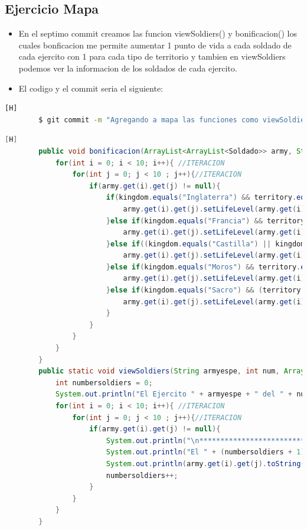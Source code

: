 \documentclass{article}
\begin{document}
	\subsection{Ejercicio Mapa}
	\begin{itemize}	
		\item En el septimo commit creamos las funcion viewSoldiers() y bonificacion() los cuales bonficacion me permite aumentar 1 punto de vida a cada soldado de cada ejercito con 1 para cada tipo de territorio y tambien en viewSoldiers podemos ver la informacion de los soldados de cada ejercito.	
		\item El codigo y el commit seria el siguiente:
	\end{itemize}	
	\begin{lstlisting}[language=bash,caption={Commit}][H]
		$ git commit -m "Agregando a mapa las funciones como viewSoldiers() y bonificacion() los cuales nos van poder mostrar el territorio y la informacion de cada soldado la cual fue cambiada por el tipo de territorio y reino que es este ejercito"
	\end{lstlisting}	
	\begin{lstlisting}[language=java,caption={Las lineas de codigos de la clase Mapa creada:}][H]
		public void bonificacion(ArrayList<ArrayList<Soldado>> army, String territory , String kingdom) {
			for(int i = 0; i < 10; i++){ //ITERACION
				for(int j = 0; j < 10 ; j++){//ITERACION
					if(army.get(i).get(j) != null){
						if(kingdom.equals("Inglaterra") && territory.equals("bosque")){
							army.get(i).get(j).setLifeLevel(army.get(i).get(j).getLifeLevel() + 1);
						}else if(kingdom.equals("Francia") && territory.equals("campo abierto")){
							army.get(i).get(j).setLifeLevel(army.get(i).get(j).getLifeLevel() + 1);
						}else if((kingdom.equals("Castilla") || kingdom.equals("Aragon")) && territory.equals("montana")){
							army.get(i).get(j).setLifeLevel(army.get(i).get(j).getLifeLevel() + 1);
						}else if(kingdom.equals("Moros") && territory.equals("desierto")){
							army.get(i).get(j).setLifeLevel(army.get(i).get(j).getLifeLevel() + 1);
						}else if(kingdom.equals("Sacro") && (territory.equals("desierto") || territory.equals("playa") || territory.equals("campo abierto"))){
							army.get(i).get(j).setLifeLevel(army.get(i).get(j).getLifeLevel() + 1);
						}
					}
				}
			}
		} 
		public static void viewSoldiers(String armyespe, int num, ArrayList<ArrayList<Soldado>> army){
			int numbersoldiers = 0;
			System.out.println("El Ejercito " + armyespe + " del " + num + " ejercito sus soldados son :");
			for(int i = 0; i < 10; i++){ //ITERACION
				for(int j = 0; j < 10 ; j++){//ITERACION
					if(army.get(i).get(j) != null){
						System.out.println("\n*********************************");
						System.out.println("El " + (numbersoldiers + 1) + " soldado es: ");
						System.out.println(army.get(i).get(j).toString());
						numbersoldiers++;
					}
				}
			}
		}
	\end{lstlisting}
\end{document}
